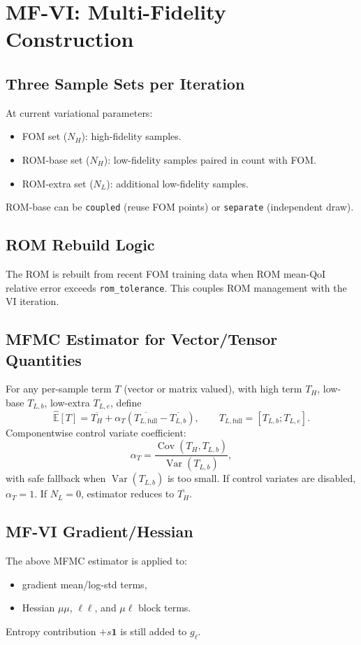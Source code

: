 \documentclass[11pt]{article}
\begin{document}
\section{MF-VI: Multi-Fidelity Construction}
\subsection{Three Sample Sets per Iteration}
At current variational parameters:
\begin{itemize}
  \item FOM set (\(N_H\)): high-fidelity samples.
  \item ROM-base set (\(N_H\)): low-fidelity samples paired in count with FOM.
  \item ROM-extra set (\(N_L\)): additional low-fidelity samples.
\end{itemize}
ROM-base can be \texttt{coupled} (reuse FOM points) or \texttt{separate} (independent draw).

\subsection{ROM Rebuild Logic}
The ROM is rebuilt from recent FOM training data when ROM mean-QoI relative error exceeds \texttt{rom\_tolerance}.
This couples ROM management with the VI iteration.

\subsection{MFMC Estimator for Vector/Tensor Quantities}
For any per-sample term \(T\) (vector or matrix valued), with high term \(T_H\), low-base \(T_{L,b}\), low-extra \(T_{L,e}\), define
\begin{equation}
\widehat{\mathbb{E}}[T]
= \overline{T_H}
 + \alpha_T\left(\overline{T_{L,\mathrm{full}}}-\overline{T_{L,b}}\right),
\qquad
T_{L,\mathrm{full}}=[T_{L,b};T_{L,e}].
\end{equation}
Componentwise control variate coefficient:
\begin{equation}
\alpha_T = \frac{\operatorname{Cov}(T_H,T_{L,b})}{\operatorname{Var}(T_{L,b})},
\end{equation}
with safe fallback when \(\operatorname{Var}(T_{L,b})\) is too small.
If control variates are disabled, \(\alpha_T=1\). If \(N_L=0\), estimator reduces to \(\overline{T_H}\).

\subsection{MF-VI Gradient/Hessian}
The above MFMC estimator is applied to:
\begin{itemize}
  \item gradient mean/log-std terms,
  \item Hessian \(\mu\mu\), \(\ell\ell\), and \(\mu\ell\) block terms.
\end{itemize}
Entropy contribution \(+s\mathbf{1}\) is still added to \(g_\ell\).
\end{document}
